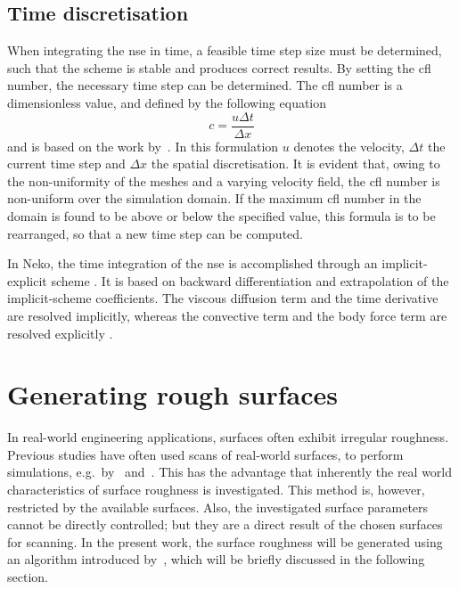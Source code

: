 \subsection{Time discretisation}\label{subsec: time discretization}

When integrating the \acrshort{nse} in time, a feasible time step size must be determined, such that the scheme is stable and produces correct results.
By setting the \acrfull{cfl} number, the necessary time step can be determined.
The \acrshort{cfl} number is a dimensionless value, and defined by the following equation
\begin{equation}\label{eq: cfl number}
    c = \frac{u\Delta t}{\Delta x}
\end{equation}
and is based on the work by~\cite{courantBerPartiellenDifferenzengleiehungen}.
In this formulation $u$ denotes the velocity, $\Delta t$ the current time step and $\Delta x$ the spatial discretisation.
It is evident that, owing to the non-uniformity of the meshes and a varying velocity field, the \acrshort{cfl} number is non-uniform over the simulation domain.
If the maximum \acrshort{cfl} number in the domain is found to be above or below the specified value, this formula is to be rearranged, so that a new time step can be computed.

In Neko, the time integration of the \acrshort{nse} is accomplished through an implicit-explicit scheme \citep{janssonNekoModernPortable2024}.
It is based on backward differentiation and extrapolation of the implicit-scheme coefficients.
The viscous diffusion term and the time derivative are resolved implicitly, whereas the convective term and the body force term are resolved explicitly \citep{janssonNekoModernPortable2024}.

\section{Generating rough surfaces}\label{sec:generating rough surfaces}
In real-world engineering applications, surfaces often exhibit irregular roughness.
Previous studies have often used scans of real-world surfaces, to perform simulations, e.g.\ by~\cite{thakkarInvestigationTurbulentFlow2017, demaioDirectNumericalSimulation2023} and~\cite{busseReynoldsnumberDependenceNearwall2017}.
This has the advantage that inherently the real world characteristics of surface roughness is investigated.
This method is, however, restricted by the available surfaces.
Also, the investigated surface parameters cannot be directly controlled; but they are a direct result of the chosen surfaces for scanning.
In the present work, the surface roughness will be generated using an algorithm introduced by~\cite{perez-rafolsGeneratingRandomlyRough2019}, which will be briefly discussed in the following section.

